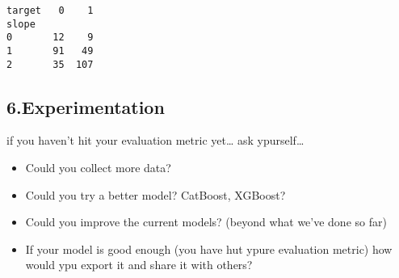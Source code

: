 \documentclass[11pt]{article}
\makeatletter
\providecommand{\tightlist}{%
      \setlength{\itemsep}{0pt}\setlength{\parskip}{0pt}}
\newcommand{\boxspacing}{\kern\kvtcb@left@rule\kern\kvtcb@boxsep}
\newcommand{\prompt}[4]{
        \ttfamily\llap{{\color{#2}[#3]:\hspace{3pt}#4}}\vspace{-\baselineskip}
    }
\makeatother
\begin{document}
            \begin{tcolorbox}[breakable, size=fbox, boxrule=.5pt, pad at break*=1mm, opacityfill=0]
\prompt{Out}{outcolor}{110}{\boxspacing}
\begin{Verbatim}[commandchars=\\\{\}]
target   0    1
slope
0       12    9
1       91   49
2       35  107
\end{Verbatim}
\end{tcolorbox}
        
    \hypertarget{experimentation}{%
\subsection{6.Experimentation}\label{experimentation}}

if you haven't hit your evaluation metric yet\ldots{} ask
ypurself\ldots{}

\begin{itemize}
\tightlist
\item
  Could you collect more data?
\item
  Could you try a better model? CatBoost, XGBoost?
\item
  Could you improve the current models? (beyond what we've done so far)
\item
  If your model is good enough (you have hut ypure evaluation metric)
  how would ypu export it and share it with others?
\end{itemize}

    \begin{tcolorbox}[breakable, size=fbox, boxrule=1pt, pad at break*=1mm,colback=cellbackground, colframe=cellborder]
\prompt{In}{incolor}{ }{\boxspacing}
\begin{Verbatim}[commandchars=\\\{\}]

\end{Verbatim}
\end{tcolorbox}


    
    
    
\end{document}
